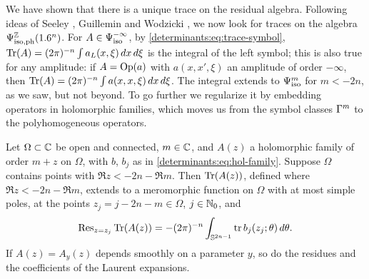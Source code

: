 We have shown that there is a unique trace on the residual algebra. Following
ideas of Seeley \cite{Seeley}, Guillemin \cite{Guillemin-Weyl,Guillemin-residue}
and Wodzicki \cite{Wodzicki-residue,Wodzicki-cyclic}, we now look for traces on
the algebra $\Psi^{\mathbb{Z}}_{\mathrm{iso,ph}}(1.6^n)$. For $A\in\Psi^{-\infty}_{\mathrm{iso}}$, by
\eqref{determinants:eq:trace-symbol}, $\operatorname{Tr}(A)=(2\pi)^{-n}\int a_L(x,\xi)\,dx\,d\xi$
is the integral of the left symbol; this is also true for any amplitude: if
$A=\operatorname{Op}(a)$ with $a(x,x',\xi)$ an amplitude of order $-\infty$, then
$\operatorname{Tr}(A)=(2\pi)^{-n}\int a(x,x,\xi)\,dx\,d\xi$. The integral extends to
$\Psi^{m}_{\mathrm{iso}}$ for $m<-2n$, as we saw, but not beyond. To go further we
regularize it by embedding operators in holomorphic families, which moves us
from the symbol classes $\Gamma^{m}$ to the polyhomogeneous operators.

\begin{lemma}\label{determinants:lem:meromorphic}
  Let $\Omega\subset\mathbb{C}$ be open and connected, $m\in\mathbb{C}$, and $A(z)$ a
  holomorphic family of order $m+z$ on $\Omega$, with $b$, $b_j$ as in
  \eqref{determinants:eq:hol-family}. Suppose $\Omega$ contains points with
  $\Re z<-2n-\Re m$. Then $\operatorname{Tr}(A(z))$, defined where $\Re z<-2n-\Re m$, extends
  to a meromorphic function on $\Omega$ with at most simple poles, at the
  points $z_j=j-2n-m\in\Omega$, $j\in\mathbb{N}_0$, and
  \begin{equation}\label{determinants:eq:residues}
    \operatorname{Res}_{z=z_j}\operatorname{Tr}(A(z))=-(2\pi)^{-n}\int_{\mathbb{S}^{2n-1}}\operatorname{tr} b_j(z_j;\theta)\,d\theta .
  \end{equation}
  If $A(z)=A_y(z)$ depends smoothly on a parameter $y$, so do the residues and
  the coefficients of the Laurent expansions.
\end{lemma}
